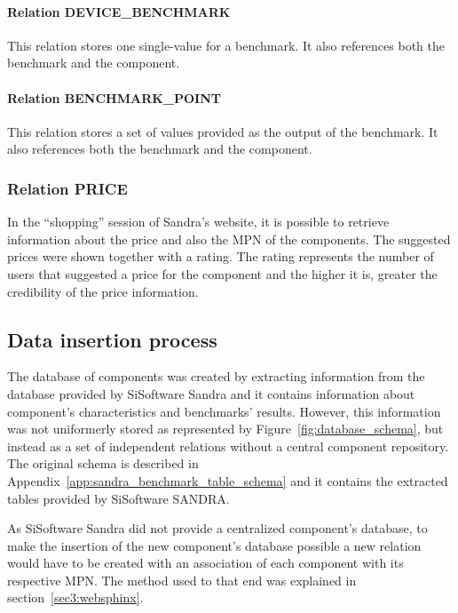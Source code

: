         \paragraph*{Relation DEVICE\_BENCHMARK}
            This relation stores one single-value for a benchmark. It also references both the benchmark and the component.
            
        \paragraph*{Relation BENCHMARK\_POINT}
            This relation stores a set of values provided as the output of the benchmark. It also references both the benchmark and the component.            

    \subsubsection*{Relation PRICE}
        In the ``shopping'' session of Sandra's website, it is possible to retrieve information about the price and also the MPN of the components. The suggested prices were shown together with a rating. The rating represents the number of users that suggested a price for the component and the higher it is, greater the credibility of the price information.
                        
\subsection{Data insertion process} \label{sec4:data_insertion}
    The database of components was created by extracting information from the database provided by SiSoftware Sandra and it contains information about component's characteristics and benchmarks' results. However, this information was not uniformerly stored as represented by Figure~\ref{fig:database_schema}, but instead as a set of independent relations without a central component repository. The original schema is described in Appendix~\ref{app:sandra_benchmark_table_schema} and it contains the extracted tables provided by SiSoftware SANDRA.
    
    As SiSoftware Sandra did not provide a centralized component's database, to make the insertion of the new component's database possible a new relation would have to be created with an association of each component with its respective MPN. The method used to that end was explained in section~\ref{sec3:websphinx}.
    
